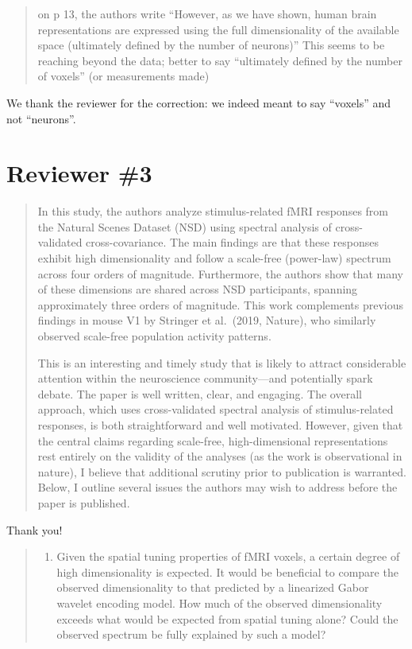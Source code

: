 \documentclass[10pt]{article}
\providecommand{\tightlist}{\setlength{\itemsep}{0pt}\setlength{\parskip}{0pt}}
\begin{document}
\begin{quote}
on p 13, the authors write ``However, as we have shown, human brain representations are expressed using the full dimensionality of the available space (ultimately defined by the number of neurons)'' This seems to be reaching beyond the data; better to say ``ultimately defined by the number of voxels'' (or measurements made)
\end{quote}

We thank the reviewer for the correction: we indeed meant to say ``voxels'' and not ``neurons''.

\section{Reviewer \#3}\label{reviewer-3}

\begin{quote}
In this study, the authors analyze stimulus-related fMRI responses from the Natural Scenes Dataset (NSD) using spectral analysis of cross-validated cross-covariance. The main findings are that these responses exhibit high dimensionality and follow a scale-free (power-law) spectrum across four orders of magnitude. Furthermore, the authors show that many of these dimensions are shared across NSD participants, spanning approximately three orders of magnitude. This work complements previous findings in mouse V1 by Stringer et al.~(2019, Nature), who similarly observed scale-free population activity patterns.

This is an interesting and timely study that is likely to attract considerable attention within the neuroscience community---and potentially spark debate. The paper is well written, clear, and engaging. The overall approach, which uses cross-validated spectral analysis of stimulus-related responses, is both straightforward and well motivated. However, given that the central claims regarding scale-free, high-dimensional representations rest entirely on the validity of the analyses (as the work is observational in nature), I believe that additional scrutiny prior to publication is warranted. Below, I outline several issues the authors may wish to address before the paper is published.
\end{quote}

Thank you!

\begin{quote}
\begin{enumerate}
\def\labelenumi{\arabic{enumi}.}
\tightlist
\item
  Given the spatial tuning properties of fMRI voxels, a certain degree of high dimensionality is expected. It would be beneficial to compare the observed dimensionality to that predicted by a linearized Gabor wavelet encoding model. How much of the observed dimensionality exceeds what would be expected from spatial tuning alone? Could the observed spectrum be fully explained by such a model?
\end{enumerate}
\end{quote}
\end{document}
